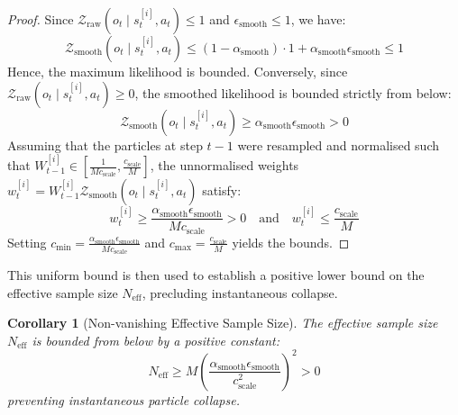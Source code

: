 \documentclass[11pt,a4paper]{report}
\newtheorem{corollary}{Corollary}[theorem]
\begin{document}
\begin{proof}
Since $\mathcal{Z}_{\text{raw}}(o_t \mid s_t^{[i]}, a_t) \le 1$ and $\epsilon_{\text{smooth}} \le 1$, we have:
\begin{equation}
    \mathcal{Z}_{\text{smooth}}(o_t \mid s_t^{[i]}, a_t) \le (1 - \alpha_{\text{smooth}}) \cdot 1 + \alpha_{\text{smooth}} \epsilon_{\text{smooth}} \le 1
\end{equation}
Hence, the maximum likelihood is bounded. Conversely, since $\mathcal{Z}_{\text{raw}}(o_t \mid s_t^{[i]}, a_t) \ge 0$, the smoothed likelihood is bounded strictly from below:
\begin{equation}
    \mathcal{Z}_{\text{smooth}}(o_t \mid s_t^{[i]}, a_t) \ge \alpha_{\text{smooth}} \epsilon_{\text{smooth}} > 0
\end{equation}
Assuming that the particles at step $t-1$ were resampled and normalised such that $W_{t-1}^{[i]} \in [\frac{1}{M c_{\text{scale}}}, \frac{c_{\text{scale}}}{M}]$, the unnormalised weights $w_t^{[i]} = W_{t-1}^{[i]} \mathcal{Z}_{\text{smooth}}(o_t \mid s_t^{[i]}, a_t)$ satisfy:
\begin{equation}
    w_t^{[i]} \ge \frac{\alpha_{\text{smooth}} \epsilon_{\text{smooth}}}{M c_{\text{scale}}} > 0 \quad \text{and} \quad w_t^{[i]} \le \frac{c_{\text{scale}}}{M}
\end{equation}
Setting $c_{\text{min}} = \frac{\alpha_{\text{smooth}} \epsilon_{\text{smooth}}}{M c_{\text{scale}}}$ and $c_{\text{max}} = \frac{c_{\text{scale}}}{M}$ yields the bounds.
\end{proof}

This uniform bound is then used to establish a positive lower bound on the effective sample size $N_{\text{eff}}$, precluding instantaneous collapse.
\begin{corollary}[Non-vanishing Effective Sample Size]
The effective sample size $N_{\text{eff}}$ is bounded from below by a positive constant:
\begin{equation}
    N_{\text{eff}} \ge M \left( \frac{\alpha_{\text{smooth}} \epsilon_{\text{smooth}}}{c_{\text{scale}}^2} \right)^2 > 0
\end{equation}
preventing instantaneous particle collapse.
\end{corollary}
\end{document}
